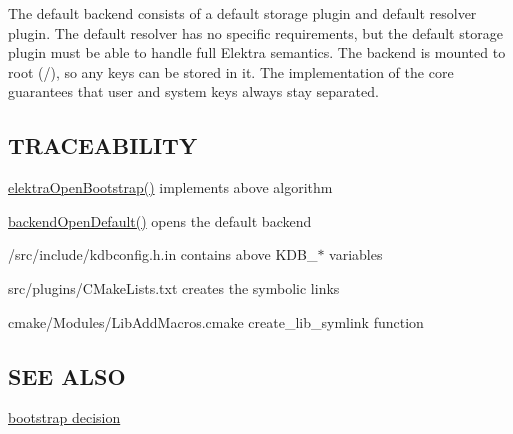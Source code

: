 The default backend consists of a default storage plugin and default resolver plugin. The default resolver has no specific requirements, but the default storage plugin must be able to handle full Elektra semantics. The backend is mounted to root ({\ttfamily /}), so any keys can be stored in it. The implementation of the core guarantees that user and system keys always stay separated.

\subsection*{T\+R\+A\+C\+E\+A\+B\+I\+L\+I\+TY}


\begin{DoxyItemize}
\item \hyperlink{group__kdb_ga5bfaad0230457cd6386032fe65c41576}{elektra\+Open\+Bootstrap()} implements above algorithm
\item \hyperlink{backend_8c_a59e270ed71ca8dca9e88032c307ca4d4}{backend\+Open\+Default()} opens the default backend
\item /src/include/kdbconfig.h.\+in contains above K\+D\+B\+\_\+$\ast$ variables
\item src/plugins/\+C\+Make\+Lists.\+txt creates the symbolic links
\item cmake/\+Modules/\+Lib\+Add\+Macros.\+cmake create\+\_\+lib\+\_\+symlink function
\end{DoxyItemize}

\subsection*{S\+EE A\+L\+SO}


\begin{DoxyItemize}
\item \hyperlink{doc_decisions_bootstrap_md}{bootstrap decision} 
\end{DoxyItemize}